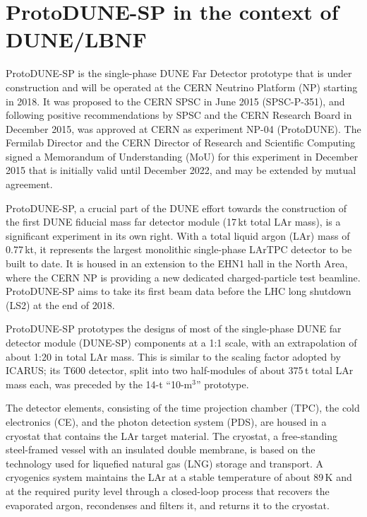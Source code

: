 
\section{ProtoDUNE-SP in the context of DUNE/LBNF}

ProtoDUNE-SP is the single-phase DUNE Far Detector prototype that is under construction and will be operated at the CERN Neutrino Platform (NP) 
starting in 2018. It was proposed to the CERN SPSC in June 2015 (SPSC-P-351), and following positive recommendations by SPSC and the CERN Research Board in December 2015, was approved at CERN as experiment NP-04 (ProtoDUNE). The Fermilab Director and the CERN Director of Research and Scientific Computing signed a Memorandum of Understanding (MoU) for this experiment in December 2015 that is initially valid until December 2022, 
and may be extended by mutual agreement. 

ProtoDUNE-SP, a crucial part of the DUNE effort towards the construction of the first DUNE  fiducial mass far detector module (17\,kt total LAr mass), is a significant experiment in its own right. With a total liquid argon (LAr) mass of 0.77\,kt, it represents the largest monolithic single-phase LArTPC detector to be built to date.  
It is housed in an extension to the EHN1 hall in the North Area, where the CERN NP is providing a new dedicated charged-particle test beamline. ProtoDUNE-SP aims to take its first beam data before the LHC long shutdown (LS2) at the end of 2018.

ProtoDUNE-SP prototypes the designs of most of the single-phase DUNE far detector module (DUNE-SP) components at a 1:1 scale, with an extrapolation of about 1:20 in total LAr mass. This is similar to the scaling factor adopted 
by ICARUS; its T600 detector, split into two half-modules of about 375\,t total LAr mass each, was preceded by the 14-t ``10-m$^3$'' prototype. 

The detector elements, consisting of the time projection chamber (TPC), the cold electronics (CE), and the photon detection system (PDS), are housed in a cryostat that contains the LAr target material. The cryostat, a free-standing steel-framed vessel with an insulated double membrane, is based on the technology used for liquefied natural gas (LNG) storage and transport. 
A cryogenics system maintains the LAr at a stable temperature of about 89\,K and at the required purity level  through a closed-loop process that recovers the evaporated argon, recondenses and filters it, and returns it to the cryostat. 

